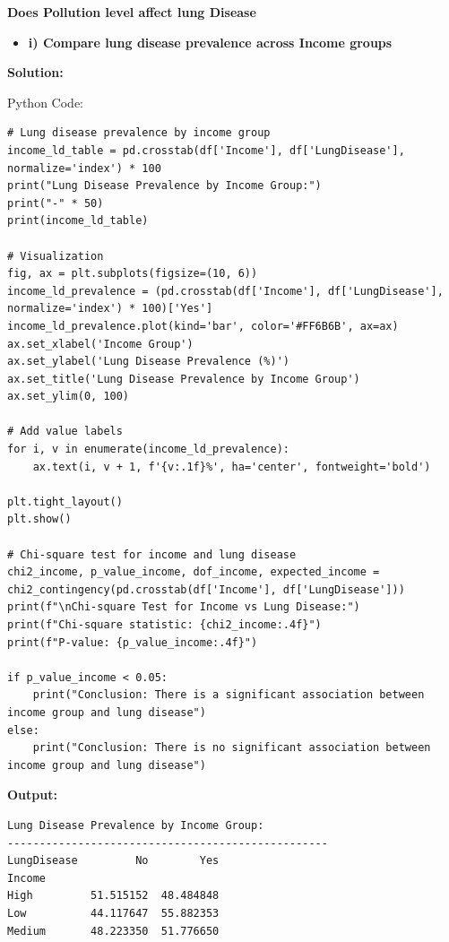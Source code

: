 \documentclass[12pt]{article}
\begin{document}
{\large \textbf{Does Pollution level affect lung Disease}}

\vspace{0.3cm}

\begin{itemize}
    \item\textbf{i) Compare lung disease prevalence across Income groups}
\end{itemize}

{\large\textbf{Solution:}}

\vspace{0.1cm}

{\large{Python Code:}}

\vspace{0.2cm}

\begin{verbatim}
# Lung disease prevalence by income group
income_ld_table = pd.crosstab(df['Income'], df['LungDisease'], normalize='index') * 100
print("Lung Disease Prevalence by Income Group:")
print("-" * 50)
print(income_ld_table)

# Visualization
fig, ax = plt.subplots(figsize=(10, 6))
income_ld_prevalence = (pd.crosstab(df['Income'], df['LungDisease'], normalize='index') * 100)['Yes']
income_ld_prevalence.plot(kind='bar', color='#FF6B6B', ax=ax)
ax.set_xlabel('Income Group')
ax.set_ylabel('Lung Disease Prevalence (%)')
ax.set_title('Lung Disease Prevalence by Income Group')
ax.set_ylim(0, 100)

# Add value labels
for i, v in enumerate(income_ld_prevalence):
    ax.text(i, v + 1, f'{v:.1f}%', ha='center', fontweight='bold')

plt.tight_layout()
plt.show()

# Chi-square test for income and lung disease
chi2_income, p_value_income, dof_income, expected_income = chi2_contingency(pd.crosstab(df['Income'], df['LungDisease']))
print(f"\nChi-square Test for Income vs Lung Disease:")
print(f"Chi-square statistic: {chi2_income:.4f}")
print(f"P-value: {p_value_income:.4f}")

if p_value_income < 0.05:
    print("Conclusion: There is a significant association between income group and lung disease")
else:
    print("Conclusion: There is no significant association between income group and lung disease")
\end{verbatim}

\textbf{Output:}

\vspace{0.3cm}

\begin{verbatim}
Lung Disease Prevalence by Income Group:
--------------------------------------------------
LungDisease         No        Yes
Income                           
High         51.515152  48.484848
Low          44.117647  55.882353
Medium       48.223350  51.776650
\end{verbatim}
\end{document}

